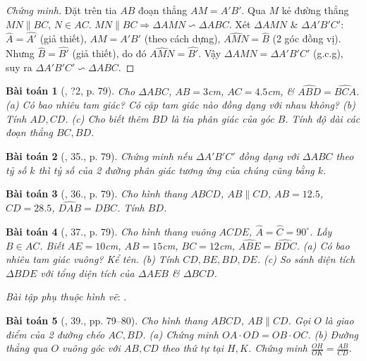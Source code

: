 \documentclass{article}
\newtheorem{baitoan}{Bài toán}
\begin{document}
\begin{proof}[Chứng minh]
	Đặt trên tia $AB$ đoạn thẳng $AM = A'B'$. Qua $M$ kẻ đường thẳng $MN\parallel BC$, $N\in AC$. $MN\parallel BC\Rightarrow\Delta AMN\backsim\Delta ABC$. Xét $\Delta AMN$ \& $\Delta A'B'C'$: $\widehat{A} = \widehat{A'}$ (giả thiết), $AM = A'B'$ (theo cách dựng), $\widehat{AMN} = \widehat{B}$ (2 góc đồng vị). Nhưng $\widehat{B} = \widehat{B'}$ (giả thiết), do đó $\widehat{AMN} = \widehat{B'}$. Vậy $\Delta AMN = \Delta A'B'C'$ (g.c.g), suy ra $\Delta A'B'C'\backsim\Delta ABC$.
\end{proof}

\begin{baitoan}[\cite{SGK_Toan_8_tap_2}, ?2, p. 79]
	Cho $\Delta ABC$, $AB = 3$\emph{cm}, $AC = 4.5$\emph{cm}, \& $\widehat{ABD} = \widehat{BCA}$. (a) Có bao nhiêu tam giác? Có cặp tam giác nào đồng dạng với nhau không? (b) Tính $AD,CD$. (c) Cho biết thêm $BD$ là tia phân giác của góc $B$. Tính độ dài các đoạn thẳng $BC,BD$.
\end{baitoan}

\begin{baitoan}[\cite{SGK_Toan_8_tap_2}, 35., p. 79]
	Chứng minh nếu $\Delta A'B'C'$ đồng dạng với $\Delta ABC$ theo tỷ số $k$ thì tỷ số của 2 đường phân giác tương ứng của chúng cũng bằng $k$.
\end{baitoan}

\begin{baitoan}[\cite{SGK_Toan_8_tap_2}, 36., p. 79]
	Cho hình thang $ABCD$, $AB\parallel CD$, $AB = 12.5$, $CD = 28.5$, $\widehat{DAB} = \widehat{DBC}$. Tính $BD$.
\end{baitoan}

\begin{baitoan}[\cite{SGK_Toan_8_tap_2}, 37., p. 79]
	Cho hình thang vuông $ACDE$, $\widehat{A} = \widehat{C} = 90^\circ$. Lấy $B\in AC$. Biết $AE = 10$\emph{cm}, $AB = 15$\emph{cm}, $BC = 12$\emph{cm}, $\widehat{ABE} = \widehat{BDC}$. (a) Có bao nhiêu tam giác vuông? Kể tên. (b) Tính $CD,BE,BD,DE$. (c) So sánh diện tích $\Delta BDE$ với tổng diện tích của $\Delta AEB$ \& $\Delta BCD$.
\end{baitoan}
\noindent\textit{Bài tập phụ thuộc hình vẽ}: \cite[38., p. 79]{SGK_Toan_8_tap_2}.

\begin{baitoan}[\cite{SGK_Toan_8_tap_2}, 39., pp. 79--80]
	Cho hình thang $ABCD$, $AB\parallel CD$. Gọi $O$ là giao điểm của 2 đường chéo $AC,BD$. (a) Chứng minh $OA\cdot OD = OB\cdot OC$. (b) Đường thẳng qua $O$ vuông góc với $AB,CD$ theo thứ tự tại $H,K$. Chứng minh $\frac{OH}{OK} = \frac{AB}{CD}$.
\end{baitoan}
\end{document}
